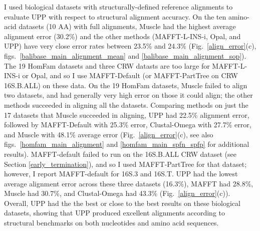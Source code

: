 I used biological datasets with structurally-defined reference
alignments to evaluate UPP with respect to structural alignment
accuracy.
On the ten amino-acid datasets (10 AA) with
full alignments, 
Muscle had the highest average alignment error (30.2\%)
and the other methods (MAFFT-L-INS-i, Opal, 
and UPP) have very close
error rates between 23.5\% and 24.3\% (Fig.~\ref{align_error}(c),
figs.~\ref{balibase_main_alignment_mean}
and \ref{balibase_main_alignment_sop}).  
The 19 HomFam datasets and three CRW datasts are too
large for MAFFT-L-INS-i or Opal, and so I use
MAFFT-Default (or MAFFT-PartTree on CRW 16S.B.ALL) on these data.
On the 19 HomFam datasets, 
Muscle failed to align
two datasets, and had generally very
high error on those it could align;
the other methods succeeded in 
aligning all the datasets. 
Comparing methods on just the 17 datasets 
that Muscle succeeded in aligning, 
UPP had 22.5\% alignment error, followed by
MAFFT-Default with 25.3\% error, 
Clustal-Omega with 27.7\% error, %
and Muscle with
48.1\% average error
(Fig.~\ref{align_error}(c),
see also figs.~\ref{homfam_main_alignment} and \ref{homfam_main_spfn_spfp}
for additional results). 
MAFFT-default failed to run
on the 16S.B.ALL CRW dataset
(see Section \ref{early_termination}),
and so I used MAFFT-PartTree for that dataset; however,
I report
MAFFT-default for 16S.3 and 16S.T.
UPP   had the lowest average alignment error across
these three datasets (16.3\%), 
MAFFT had 28.8\%, 
Muscle had 30.7\%, and
Clustal-Omega  had 43.3\% (Fig.~\ref{align_error}(c)).
Overall, UPP had the the best or close to the best results 
on these biological datasets, showing 
that UPP produced excellent alignments  
according to structural benchmarks on both nucleotides and amino acid sequences.

